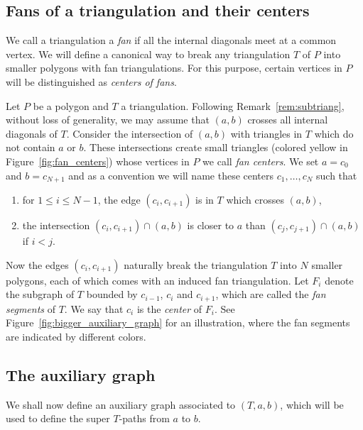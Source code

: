 \documentclass[pdftex]{sigma}
\numberwithin{equation}{section}
\begin{document}
\subsection{Fans of a triangulation and their centers}

We call a triangulation a \emph{fan} if all the internal diagonals meet at a common vertex.
We will define a canonical way to break any triangulation $T$ of $P$ into smaller polygons with fan triangulations.
For this purpose, certain vertices in $P$ will be distinguished as \emph{centers of fans}.



Let $P$ be a polygon and $T$ a triangulation. Following Remark~\ref{rem:subtriang}, without loss of generality, we may assume that
$(a,b)$ crosses all internal diagonals of $T$.
Consider the intersection of $(a,b)$ with triangles in $T$ which do not contain $a$ or $b$.
These intersections create small triangles (colored yellow in Figure~\ref{fig:fan_centers}) whose vertices in $P$ we call \emph{fan centers}.
We set $a=c_0$ and $b=c_{N+1}$ and as a convention we will name these centers $c_1,\dots,c_N$ such that
\begin{enumerate}\itemsep=0pt
 \item[1)] for $1\leq i\leq N-1$, the edge $(c_i,c_{i+1})$ is in $T$ which crosses $(a,b)$,
 \item[2)] the intersection $(c_i,c_{i+1}) \cap (a,b)$ is closer to $a$ than $(c_j,c_{j+1}) \cap (a,b)$ if $i<j$.
\end{enumerate}

Now the edges $(c_i,c_{i+1})$ naturally break the triangulation $T$ into $N$ smaller polygons, each of which
comes with an induced fan triangulation. Let $F_i$ denote the subgraph of $T$ bounded by $c_{i-1}$, $c_{i}$ and $c_{i+1}$,
which are called the \emph{fan segments} of $T$. We say that $c_i$ is the \emph{center} of $F_i$.
 See Figure~\ref{fig:bigger_auxiliary_graph} for an illustration, where the fan segments are indicated by different colors.

\subsection{The auxiliary graph}

We shall now define an auxiliary graph associated to $(T,a,b)$, which will be used to define the super $T$-paths from $a$ to $b$.
	
\end{document}
